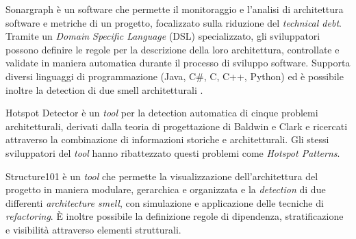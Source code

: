     Sonargraph \cite{sonargraph}\cite{SonargraphArticle} è un software che permette il monitoraggio e l'analisi di architettura software e metriche di un progetto, focalizzato sulla riduzione del \textit{technical debt}. Tramite un \textit{Domain Specific Language} (DSL) specializzato, gli sviluppatori possono definire le regole per la descrizione della loro architettura, controllate e validate in maniera automatica durante il processo di sviluppo software. Supporta diversi linguaggi di programmazione (Java, C#, C, C++, Python) ed è possibile inoltre la detection di due smell architetturali \cite{AzadiFontana}.
    
    
    Hotspot Detector \cite{HotspotDetector} è un \textit{tool} per la detection automatica di cinque problemi architetturali, derivati dalla teoria di progettazione di Baldwin e Clark \cite{BaldwinClark_DesignRulesVolume1} e ricercati attraverso la combinazione di informazioni storiche e architetturali. Gli stessi sviluppatori del \textit{tool} hanno ribattezzato questi problemi come \textit{Hotspot Patterns}.


    Structure101 \cite{structure101} è un \textit{tool} che permette la visualizzazione dell'architettura del progetto in maniera modulare, gerarchica e organizzata e la \textit{detection} di due differenti \textit{architecture smell}, con simulazione e applicazione delle tecniche di \textit{refactoring}. È inoltre possibile la definizione regole di dipendenza, stratificazione e visibilità attraverso elementi strutturali.


